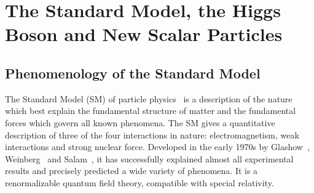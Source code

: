 \chapter{The Standard Model, the Higgs Boson and New Scalar Particles}

\section{Phenomenology of the Standard Model}


The Standard Model (SM) of particle physics~\cite{Halzen:1984mc} is a description of the nature which best explain  the fundamental structure of matter and the fundamental forces which govern all known phenomena. The SM gives a quantitative description of three of the four interactions in nature: electromagnetism, weak interactions and  strong nuclear force.
Developed in the early 1970s by Glashow~\cite{GLASHOW1961579}, Weinberg~\cite{PhysRevLett.19.1264} and Salam~\cite{Salam:1968rm}, it has successfully explained almost
all experimental results and precisely predicted a wide variety of phenomena.
It is a renormalizable quantum field theory, compatible with special relativity.

